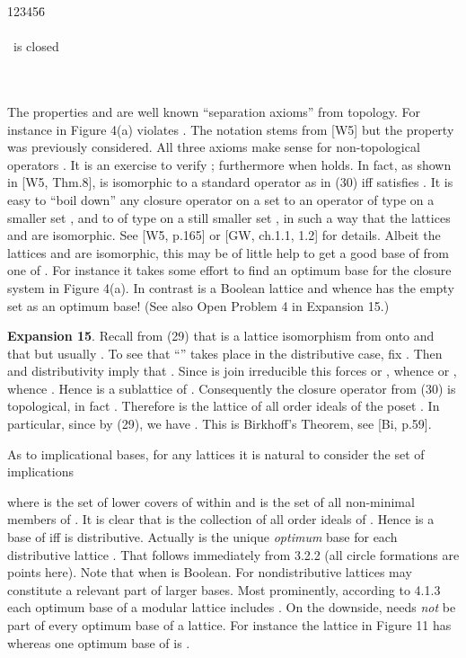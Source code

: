 \documentclass[11pt]{article}
\begin{document}
\begin{tabbing}
123456\=\kill
 \> \\
\\
 \>  \ is closed\\
\\
 \> \\ 
\end{tabbing}

The properties  and  are well known ``separation axioms'' from topology. For instance  in Figure 4(a) violates .
The notation  stems from [W5] but the property was previously considered. All three axioms make sense for non-topological operators . It is an exercise to verify ; furthermore  when  holds. In fact, as shown in [W5, Thm.8],  is isomorphic to a standard operator  as in (30) iff  satisfies . It is easy to ``boil down'' any closure operator  on a set  to an operator  of type  on a smaller set , and  to  of type  on a still smaller set , in such a way that the lattices  and  are isomorphic.
See [W5, p.165] or [GW, ch.1.1, 1.2] for details.  
Albeit the lattices  and  are isomorphic, this may be of little help to get a good base of  from one of . For instance it takes some effort to find an optimum base for the closure system  in Figure 4(a). In contrast  is a Boolean lattice and whence has the empty set as an optimum base! (See also Open Problem 4 in Expansion 15.)

{\bf Expansion 15}. Recall from (29) that  is a lattice isomorphism from  onto  and that  but usually . To see that ``'' takes place in the distributive case, fix . Then  and distributivity imply that . Since  is join irreducible this forces  or , whence  or , whence . Hence  is a sublattice of . Consequently the closure operator  from (30) is topological, in fact . 
Therefore  is the lattice  of all order ideals of the poset .
In particular, since  by (29), we have . This is Birkhoff's Theorem, see [Bi, p.59]. 

As to implicational bases, for any lattices  it is natural to consider the set  
of implications

where  is the set of lower covers of  within  and  is the set of all non-minimal members of . It is clear that  is the collection of all order ideals of . Hence  is a base of  iff  is distributive.  Actually  is the unique {\it optimum} base for each distributive lattice . That follows immediately from 3.2.2 (all circle formations are points here). Note that  when  is Boolean. For nondistributive lattices  may constitute a relevant part of larger bases. Most prominently, according to 4.1.3 each optimum base of a modular lattice includes .  On the downside,  needs {\it not} be part of every optimum base of a lattice. For instance the lattice  in Figure 11 has  whereas one optimum base of  is .
\end{document}
